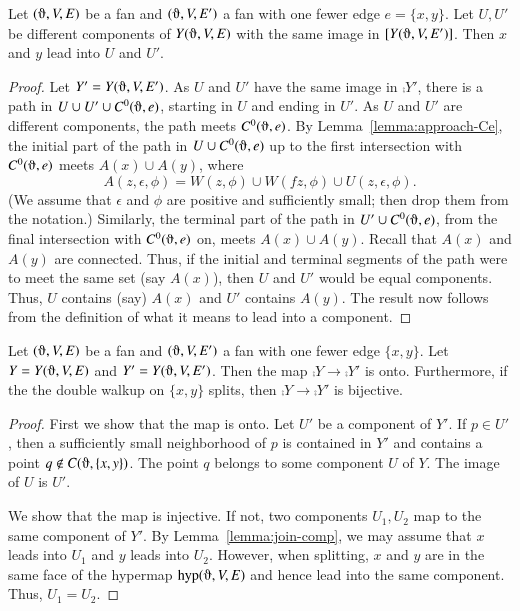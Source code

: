 \begin{lemma}\label{lemma:join-comp}
Let $(\orgn,V,E)$ be a fan and $(\orgn,V,E')$
a fan with one fewer edge $e=\{x,y\}$.
Let $U,U'$ be different
components of $Y(\orgn,V,E)$ with the same
image in $\comp{Y(\orgn,V,E')}$.  Then 
$x$ and $y$ lead into $U$ and $U'$.
\end{lemma}

\begin{proof}  Let $Y'=Y(\orgn,V,E')$.
As $U$ and $U'$ have the same image in $\comp{Y'}$,
there is a path in $U\cup U'\cup C^0(\orgn,e)$, starting in $U$
and ending in $U'$.  As $U$ and $U'$ are different components,
the path meets $C^0(\orgn,e)$.
By Lemma~\ref{lemma:approach-Ce}, the
initial part of the path in $U\cup C^0(\orgn,e)$ up to the first
intersection with $C^0(\orgn,e)$ meets $A(x)\cup A(y)$, where
  $$
  A(z,\epsilon,\phi) = 
    W(z,\phi) \cup W(f z,\phi) 
  \cup U(z,\epsilon,\phi).
  $$
(We assume that $\epsilon$ and $\phi$ are positive and sufficiently
small; then drop them from the notation.)
Similarly, the terminal part of the path in $U'\cup C^0(\orgn,e)$, 
from the
final intersection with $C^0(\orgn,e)$ on, meets $A(x)\cup A(y)$.
Recall that $A(x)$ and $A(y)$ are connected.  Thus,
if the initial and terminal segments of the path were to
meet the
same set (say $A(x)$), then $U$ and $U'$ would be equal components.
Thus, $U$ contains (say) $A(x)$ and $U'$ contains $A(y)$.
The result now follows from the definition of what it means
to lead into a component.
\end{proof}


\begin{lemma}
Let $(\orgn,V,E)$ be a fan and $(\orgn,V,E')$
a fan with one fewer edge $\{x,y\}$.
Let $Y=Y(\orgn,V,E)$ and $Y'=Y(\orgn,V,E')$.
Then
the map  $\comp{Y}\to \comp{Y'}$ is onto.
Furthermore, if the the double walkup
on $\{x,y\}$ splits,
then $\comp{Y}\to\comp{Y'}$ is bijective.
\end{lemma}

\begin{proof}
First we show that the map is onto.  Let $U'$
be a component of $Y'$.  If $p\in U'$,
then a sufficiently small neighborhood of $p$ is contained
in $Y'$ and contains a point $q\not\in C(\orgn,\{x,y\})$.  The
point $q$ belongs to some component $U$ of $Y$.  The image
of $U$ is $U'$.

We show that the map is injective.  If not, two
components $U_1,U_2$ map to the same component of $Y'$.
By Lemma~\ref{lemma:join-comp}, we may assume
that $x$ leads into $U_1$ and
$y$ leads into $U_2$.
However, when splitting, $x$ and $y$ are in the same face of
the hypermap $\op{hyp}(\orgn,V,E)$ and hence lead into the
same component.  Thus, $U_1=U_2$.
\end{proof}

